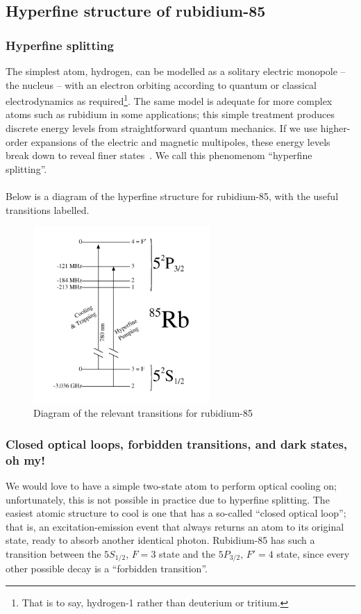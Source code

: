 \documentclass[11pt,twoside,a4paper]{article}
\begin{document}
\subsection{Hyperfine structure of rubidium-85}
\subsubsection{Hyperfine splitting}
The simplest atom, hydrogen, can be modelled as a solitary electric monopole -- the nucleus -- with an electron orbiting according to quantum or classical electrodynamics as required\footnote{That is to say, hydrogen-1 rather than deuterium or tritium.}. The same
model is adequate for more complex atoms such as rubidium in some applications; this simple treatment produces discrete energy levels from straightforward quantum mechanics. If we use higher-order expansions
of the electric and magnetic multipoles, these energy levels break down to reveal finer states~\cite{satspec}. We call this phenomenom ``hyperfine splitting''.
\\\\
Below is a diagram of the hyperfine structure for rubidium-85, with the useful transitions labelled.
\begin{figure}[h]
    \centering
    \includegraphics[width=0.6\textwidth]{images/transitions.png}
    \caption{Diagram of the relevant transitions for rubidium-85~\cite{ust}}
\end{figure}
\subsubsection{Closed optical loops, forbidden transitions, and dark states, oh my!}
We would love to have a simple two-state atom to perform optical cooling on; unfortunately, this is not possible in practice due to hyperfine splitting. The easiest atomic structure to cool is one that has a so-called ``closed optical loop''; that is,
an excitation-emission event that always returns an atom to its original state, ready to absorb another identical photon. Rubidium-85 has such a transition between the \(5S_{1/2},\,F=3\) state and the \(5P_{3/2},\,F'=4\) state, since every other possible decay is a ``forbidden transition''.
\end{document}
